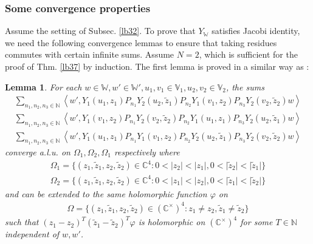 \documentclass[11pt,b5paper,notitlepage]{article}
\theoremstyle{definition}
\theoremstyle{plain}
\newtheorem{lm}[df]{Lemma}
\newcommand{\wtd}{\widetilde}
\newcommand{\Vbb}{\mathbb V}
\newcommand{\Wbb}{\mathbb W}
\newcommand{\Cbb}{\mathbb C}
\newcommand{\Nbb}{\mathbb N}
\newcommand{\<}{\left\langle}
\renewcommand{\>}{\right\rangle}
\numberwithin{equation}{subsection}
\begin{document}
\subsubsection{Some convergence properties}






Assume the setting of Subsec. \ref{lb32}. To prove that $Y_\Wbb$ satisfies Jacobi identity, we need the following convergence lemmas to ensure that taking residues commutes with certain infinite sums. Assume $N=2$, which is sufficient for the proof of Thm. \ref{lb37} by induction. The first lemma is proved in a similar way as \cite[Prop. 3.5.1]{FHL93}:


\begin{lm}\label{lb29}
         For each $w\in \Wbb,w'\in \Wbb',u_1,v_1\in \Vbb_1,u_2,v_2\in \Vbb_2$, the sums
\begin{subequations}
\begin{gather}
\sum_{n_1,n_2,n_3\in\Nbb} \<w',Y_1(u_1,z_1)P_{n_1}Y_2(u_2, \wtd z_1)P_{n_2}Y_1(v_1,z_2)P_{n_3}Y_2(v_2,\wtd z_2)w\>  \label{locality1}\\
\sum_{n_1,n_2,n_3\in\Nbb} \<w',Y_1(v_1,z_2)P_{n_1}Y_2(v_2, \wtd z_2)P_{n_2}Y_1(u_1,z_1)P_{n_3}Y_2(u_2,\wtd z_1)w\>  \label{locality2}\\
\sum_{n_1,n_2,n_3\in\Nbb} \<w',Y_1(u_1,z_1)P_{n_1}Y_1(v_1,z_2)P_{n_2}Y_2(u_2, \wtd z_1)P_{n_3}Y_2(v_2,\wtd z_2)w\>  \label{eq104}
\end{gather}
\end{subequations}
converge a.l.u. on $\Omega_1,\Omega_2,\Omega_1$ respectively where
\begin{subequations}
\begin{gather}
\Omega_1=\{(z_1,\wtd z_1,z_2,\wtd z_2)\in \Cbb^4:0<\vert z_2\vert <\vert z_1\vert,0<\vert \wtd z_2\vert <\vert \wtd z_1\vert\}\\
\Omega_2=\{(z_1,\wtd z_1,z_2,\wtd z_2)\in \Cbb^4:0<\vert z_1\vert <\vert z_2\vert,0<\vert \wtd z_1\vert <\vert \wtd z_2\vert\}
\end{gather}
\end{subequations}
and can be extended to the same holomorphic function $\varphi$ on 
\begin{gather}
\Omega=\{(z_1,\wtd z_1,z_2,\wtd z_2)\in (\Cbb^\times)^4:z_1\ne z_2,\wtd z_1\ne \wtd z_2\}  \label{eq91}
\end{gather}
such that $(z_1-z_2)^T (\wtd z_1-\wtd z_2)^T \varphi$ is holomorphic on $(\Cbb^\times)^4$ for some $T\in \Nbb$ independent of $w,w'$.
\end{lm}
\end{document}
